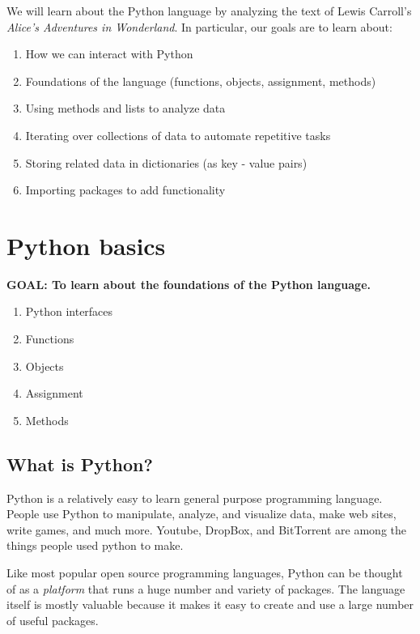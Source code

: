 \documentclass[]{book}
\providecommand{\tightlist}{%
  \setlength{\itemsep}{0pt}\setlength{\parskip}{0pt}}
\begin{document}
We will learn about the Python language by analyzing the text of Lewis
Carroll's \emph{Alice's Adventures in Wonderland}. In particular, our
goals are to learn about:

\begin{enumerate}
\def\labelenumi{\arabic{enumi}.}
\tightlist
\item
  How we can interact with Python
\item
  Foundations of the language (functions, objects, assignment, methods)
\item
  Using methods and lists to analyze data
\item
  Iterating over collections of data to automate repetitive tasks
\item
  Storing related data in dictionaries (as key - value pairs)
\item
  Importing packages to add functionality
\end{enumerate}

\section{Python basics}\label{python-basics}

\textbf{GOAL: To learn about the foundations of the Python language.}

\begin{enumerate}
\def\labelenumi{\arabic{enumi}.}
\tightlist
\item
  Python interfaces
\item
  Functions
\item
  Objects
\item
  Assignment
\item
  Methods
\end{enumerate}

\subsection{What is Python?}\label{what-is-python}

Python is a relatively easy to learn general purpose programming
language. People use Python to manipulate, analyze, and visualize data,
make web sites, write games, and much more. Youtube, DropBox, and
BitTorrent are among the things people used python to make.

Like most popular open source programming languages, Python can be
thought of as a \emph{platform} that runs a huge number and variety of
packages. The language itself is mostly valuable because it makes it
easy to create and use a large number of useful packages.
\end{document}
